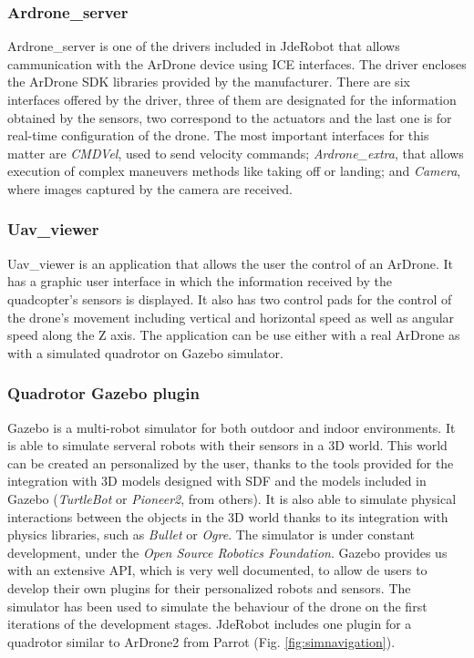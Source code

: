 \documentclass{styles/svproc}
\begin{document}
\subsubsection{Ardrone\_server}

	Ardrone\_server is one of the drivers included in JdeRobot that allows cammunication with the ArDrone device using ICE interfaces. The driver encloses the ArDrone SDK libraries provided by the manufacturer. There are six interfaces offered by the driver, three of them are designated for the information obtained by the sensors, two correspond to the actuators and the last one is for real-time configuration of the drone. The most important interfaces for this matter are \textit{CMDVel}, used to send velocity commands; \textit{Ardrone\_extra}, that allows execution of complex maneuvers methods like taking off or landing; and \textit{Camera}, where images captured by the camera are received.

\subsubsection{Uav\_viewer}

	Uav\_viewer is an application that allows the user the control of an ArDrone. It has a graphic user interface in which the information received by the quadcopter's sensors is displayed. It also has two control pads for the control of the drone's movement including vertical and horizontal speed as well as angular speed along the Z axis. The application can be use either with a real ArDrone as with a simulated quadrotor on Gazebo simulator.

\subsubsection{Quadrotor Gazebo plugin}

	Gazebo is a multi-robot simulator for both outdoor and indoor environments. It is able to simulate serveral robots with their sensors in a 3D world. This world can be created an personalized by the user, thanks to the tools provided for the integration with 3D models designed with SDF and the models included in Gazebo (\textit{TurtleBot} or \textit{Pioneer2}, from others). It is also able to simulate physical interactions between the objects in the 3D world thanks to its integration with physics libraries, such as \textit{Bullet} or \textit{Ogre}. The simulator is under constant development, under the \textit{Open Source Robotics Foundation}. Gazebo provides us with an extensive API, which is very well documented, to allow de users to develop their own plugins for their personalized robots and sensors. The simulator has been used to simulate the behaviour of the drone on the first iterations of the development stages. JdeRobot includes one plugin for a quadrotor similar to ArDrone2 from Parrot (Fig. \ref{fig:simnavigation}).
\end{document}
